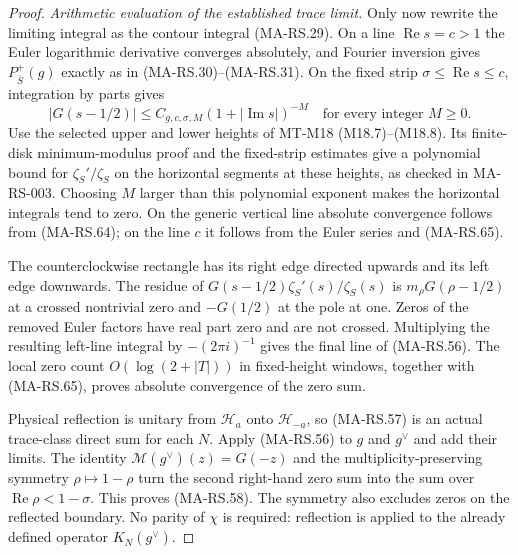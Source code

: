 \begin{proof}
\emph{Arithmetic evaluation of the established trace limit.}
Only now rewrite the limiting integral as the contour
integral (MA-RS.29). On a line $\operatorname{Re}s=c>1$
the Euler logarithmic derivative converges absolutely,
and Fourier inversion gives $P_{\overline S}^{+}(g)$
exactly as in (MA-RS.30)--(MA-RS.31).
On the fixed strip $\sigma\le\operatorname{Re}s\le c$,
integration by parts gives
\[
 |G(s-1/2)|\le C_{g,c,\sigma,M}
                    (1+|\operatorname{Im}s|)^{-M}
                  \quad\text{for every integer }M\ge0.
 \tag{MA-RS.65}
\]
Use the selected upper and lower heights of MT-M18
(M18.7)--(M18.8). Its finite-disk minimum-modulus proof
and the fixed-strip estimates give a polynomial bound
for $\zeta_S'/\zeta_S$ on the horizontal segments at
these heights, as checked in MA-RS-003.
Choosing $M$ larger than this polynomial exponent makes
the horizontal integrals tend to zero. On the generic
vertical line absolute convergence follows from
(MA-RS.64); on the line $c$ it follows from the Euler
series and (MA-RS.65).

The counterclockwise rectangle has its right edge directed
upwards and its left edge downwards. The residue of
$G(s-1/2)\zeta_S'(s)/\zeta_S(s)$ is
$m_\rho G(\rho-1/2)$ at a crossed nontrivial zero and
$-G(1/2)$ at the pole at one. Zeros of the removed Euler
factors have real part zero and are not crossed.
Multiplying the resulting left-line integral by
$-(2\pi i)^{-1}$ gives the final line of (MA-RS.56).
The local zero count $O(\log(2+|T|))$ in fixed-height
windows, together with (MA-RS.65), proves absolute
convergence of the zero sum.

Physical reflection is unitary from $\mathcal H_a$ onto
$\mathcal H_{-a}$, so (MA-RS.57) is an actual trace-class
direct sum for each $N$. Apply (MA-RS.56) to $g$ and
$g^\vee$ and add their limits. The identity
$\mathcal M(g^\vee)(z)=G(-z)$ and the multiplicity-preserving
symmetry $\rho\mapsto1-\rho$ turn the second right-hand
zero sum into the sum over $\operatorname{Re}\rho<1-\sigma$.
This proves (MA-RS.58). The symmetry also excludes zeros
on the reflected boundary. No parity of $\chi$ is required:
reflection is applied to the already defined operator
$K_N(g^\vee)$.
\end{proof}

